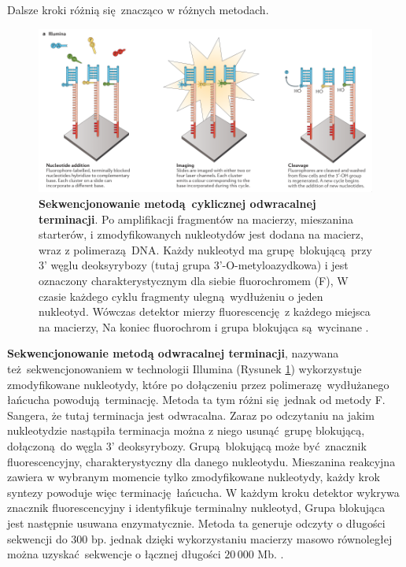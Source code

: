 \documentclass[two column, twoside, a4paper]{article}
\begin{document}
Dalsze kroki różnią się znacząco w różnych metodach.

\begin{figure}[bp]
	\begin{tcolorbox}
		\centering
		\includegraphics[width=\textwidth]{./figury/illumina.png}
		\caption{\textbf{Sekwencjonowanie metodą cyklicznej odwracalnej terminacji}. Po amplifikacji fragmentów na macierzy, mieszanina starterów, i zmodyfikowanych nukleotydów jest dodana na macierz, wraz z polimerazą DNA. Każdy nukleotyd ma grupę blokującą przy 3' węglu deoksyrybozy (tutaj grupa 3'-O-metyloazydkowa) i jest oznaczony charakterystycznym dla siebie fluorochromem (F),  W czasie każdego cyklu fragmenty ulegną wydłużeniu o jeden nukleotyd. Wówczas detektor mierzy fluorescencję z każdego miejsca na macierzy, Na koniec fluorochrom i grupa blokująca są wycinane \autocite{Godwin2016}.}\label{fig::illumina}
	\end{tcolorbox}
\end{figure}

\textbf{Sekwencjonowanie metodą odwracalnej terminacji}, nazywana też sekwencjonowaniem w technologii Illumina (Rysunek \ref{fig::illumina}) wykorzystuje zmodyfikowane nukleotydy, które po dołączeniu przez polimerazę wydłużanego łańcucha powodują terminację. Metoda ta tym różni się jednak od metody F. Sangera, że tutaj terminacja jest odwracalna. Zaraz po odczytaniu na jakim nukleotydzie nastąpiła terminacja można z niego usunąć grupę blokującą, dołączoną do węgla 3' deoksyrybozy. Grupą blokującą może być znacznik fluorescencyjny, charakterystyczny dla danego nukleotydu. Mieszanina reakcyjna zawiera w wybranym momencie tylko zmodyfikowane nukleotydy, każdy krok syntezy powoduje więc terminację łańcucha. W każdym kroku detektor wykrywa znacznik fluorescencyjny i identyfikuje terminalny nukleotyd, Grupa blokująca jest następnie usuwana enzymatycznie. Metoda ta generuje odczyty o długości sekwencji do 300 bp. jednak dzięki wykorzystaniu macierzy masowo równoległej można uzyskać sekwencje o łącznej długości $20\,000$ Mb. \autocite{Godwin2016}.
\end{document}
